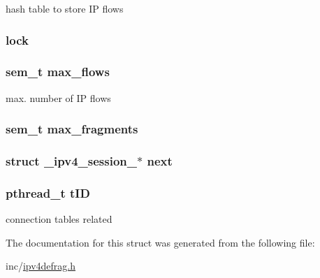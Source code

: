 hash table to store I\-P flows 

\hypertarget{struct__ipv4__session___aad15823e4f2835531e6a02321cd53f7e}{
\subsubsection[{lock}]{ lock}}\label{struct__ipv4__session___aad15823e4f2835531e6a02321cd53f7e}
\hypertarget{struct__ipv4__session___aba31d11fb16b2f989c42f6433365649e}{
\subsubsection[{max\-\_\-flows}]{\setlength{\rightskip}{0pt plus 5cm}sem\-\_\-t max\-\_\-flows}}\label{struct__ipv4__session___aba31d11fb16b2f989c42f6433365649e}


max. number of I\-P flows 

\hypertarget{struct__ipv4__session___a122dd84b8082b78785803252948a6ad0}{
\subsubsection[{max\-\_\-fragments}]{\setlength{\rightskip}{0pt plus 5cm}sem\-\_\-t max\-\_\-fragments}}\label{struct__ipv4__session___a122dd84b8082b78785803252948a6ad0}
\hypertarget{struct__ipv4__session___ad26a99e8003a094ea95493f8b3a22bea}{
\subsubsection[{next}]{\setlength{\rightskip}{0pt plus 5cm}struct {\bf \-\_\-ipv4\-\_\-session\-\_\-}$\ast$ next}}\label{struct__ipv4__session___ad26a99e8003a094ea95493f8b3a22bea}
\hypertarget{struct__ipv4__session___ab10186c154259d2b4ed2d25b7e23ed17}{
\subsubsection[{t\-I\-D}]{\setlength{\rightskip}{0pt plus 5cm}pthread\-\_\-t t\-I\-D}}\label{struct__ipv4__session___ab10186c154259d2b4ed2d25b7e23ed17}


connection tables related 



The documentation for this struct was generated from the following file\-:\begin{DoxyCompactItemize}
\item 
inc/\hyperlink{ipv4defrag_8h}{ipv4defrag.\-h}\end{DoxyCompactItemize}
